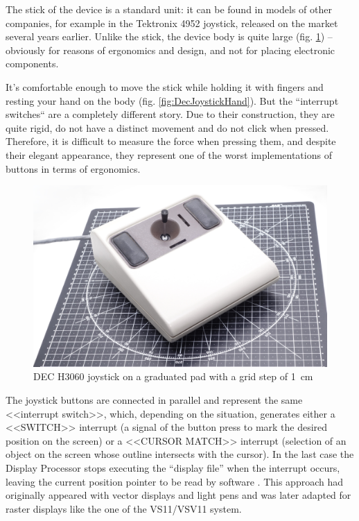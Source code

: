 \documentclass[11pt, a4paper]{article}
\begin{document}
The stick of the device is a standard unit: it can be found in models of other companies, for example in the Tektronix 4952 joystick, released on the market several years earlier. Unlike the stick, the device body is quite large (fig. \ref{fig:DecJoystickSize}) -- obviously for reasons of ergonomics and design, and not for placing electronic components.

It's comfortable enough to move the stick while holding it with fingers and resting your hand on the body (fig. \ref{fig:DecJoystickHand}). But the ``interrupt switches`` are a completely different story. Due to their construction, they are quite rigid, do not have a distinct movement and do not click when pressed. Therefore, it is difficult to measure the force when pressing them, and despite their elegant appearance, they represent one of the worst implementations of buttons in terms of ergonomics.

\begin{figure}[h]
    \centering
    \includegraphics[scale=0.35]{1978_dec_h3060_joystick/size_30.jpg}
    \caption{DEC H3060 joystick on a graduated pad with a grid step of 1~cm}
    \label{fig:DecJoystickSize}
\end{figure}

The joystick buttons are connected in parallel and represent the same <<interrupt switch>>, which, depending on the situation, generates either a <<SWITCH>> interrupt (a signal of the button press to mark the desired position on the screen) or a <<CURSOR MATCH>> interrupt (selection of an object on the screen whose outline intersects with the cursor). In the last case the Display Processor stops executing the ``display file'' when the interrupt occurs, leaving the current position pointer to be read by software  \cite{vsv11}. This approach had originally appeared with vector displays and light pens and was later adapted for raster displays like the one of the VS11/VSV11 system.
\end{document}
